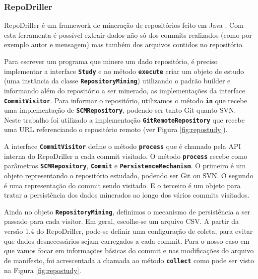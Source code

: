 \documentclass[a4paper,12pt]{article}
\begin{document}

\subsubsection{RepoDriller}%
\label{sec:repodriller}
RepoDriller é um framework de mineração de repositórios feito em Java  \cite{repodriller}. Com esta ferramenta é possível extrair dados não só dos commits realizados (como por exemplo autor e mensagem) mas também dos arquivos contidos no repositório.

Para escrever um programa que minere um dado repositório, é preciso implementar a interface {\small\texttt{\textbf{Study}}} e no método {\small\texttt{\textbf{execute}}} criar um objeto de estudo (uma instância da classe {\small\texttt{\textbf{RepositoryMining}}}) utilizando o padrão builder e informando além do repositório a ser minerado, as implementações da interface {\small\texttt{\textbf{CommitVisitor}}}.  Para informar o repositório, utilizamos o método {\small\texttt{\textbf{in}}} que recebe uma implementação de  {\small\texttt{\textbf{SCMRepository}}}, podendo ser tanto Git quanto SVN. Neste trabalho foi utilizado a implementação {\small\texttt{\textbf{GitRemoteRepository}}} que recebe uma URL referenciando o repositório remoto (ver Figura \ref{fig:repostudy}).

A interface {\small\texttt{\textbf{CommitVisitor}}} define o método {\small\texttt{\textbf{process}}} que é chamado pela API interna do RepoDriller a cada commit visitado. O método {\small\texttt{\textbf{process}}} recebe como parâmetros {\small\texttt{\textbf{SCMRepository}}}, {\small\texttt{\textbf{Commit}}} e {\small\texttt{\textbf{PersistenceMechanism}}}. O primeiro é um objeto representando o repositório estudado, podendo ser Git ou SVN. O segundo é uma representação do commit sendo visitado. E o terceiro é um objeto para tratar a persistência dos dados minerados ao longo dos vários commits visitados.

Ainda no objeto {\small\texttt{\textbf{RepositoryMining}}}, definimos o mecanismo de persistência a ser passado para cada visitor. Em geral, escolhe-se um arquivo CSV. A partir da versão 1.4 do RepoDriller, pode-se definir uma configuração de coleta, para evitar que dados desnecessários sejam carregados a cada commit. Para o nosso caso em que vamos focar em informações básicas do commit e nas modificações do arquivo de manifesto, foi acrescentada a chamada ao método  {\small\texttt{\textbf{collect}}} como pode ser visto na Figura \ref{fig:repostudy}.
\end{document}
